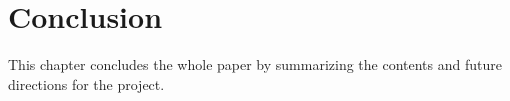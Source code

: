 \documentclass [11pt, proquest] {uwthesis}[2020/02/24]
\begin{document}


    

\chapter{Conclusion}
This chapter concludes the whole paper by summarizing the contents and  future directions for the project.
\end{document}
